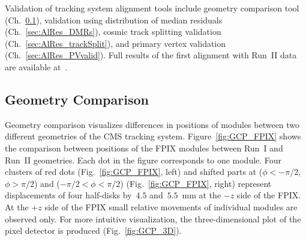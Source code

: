 Validation of tracking system alignment tools include geometry comparison tool (Ch.~\ref{sec:AlRes_GCP}), validation using distribution of median residuals (Ch.~\ref{sec:AlRes_DMRs}), cosmic track splitting validation (Ch.~\ref{sec:AlRes_trackSplit}), and primary vertex validation (Ch.~\ref{sec:AlRes_PVvalid}). Full results of the first alignment with Run~II data are available at~\cite{ref_AlApproved_twiki}.

\subsection{Geometry Comparison}
\label{sec:AlRes_GCP}

Geometry comparison visualizes differences in positions of modules between two different geometries of the CMS tracking system. Figure~\ref{fig:GCP_FPIX} shows the comparison between positions of the FPIX modules between Run~I and Run~II geometries. Each dot in the figure corresponds to one module. Four clusters of red dots (Fig.~\ref{fig:GCP_FPIX}, left) and shifted parts at ($\phi<-\pi/2$, $\phi>\pi/2$) and ($-\pi/2<\phi<\pi/2$) (Fig.~\ref{fig:GCP_FPIX}, right) represent displacements of four half-disks by~$4.5$ and~$5.5$~mm at the $-z$ side of the FPIX. At the $+z$ side of the FPIX small relative movements of individual modules are observed only. For more intuitive visualization, the three-dimensional plot of the pixel detector is produced (Fig.~\ref{fig:GCP_3D}).     

